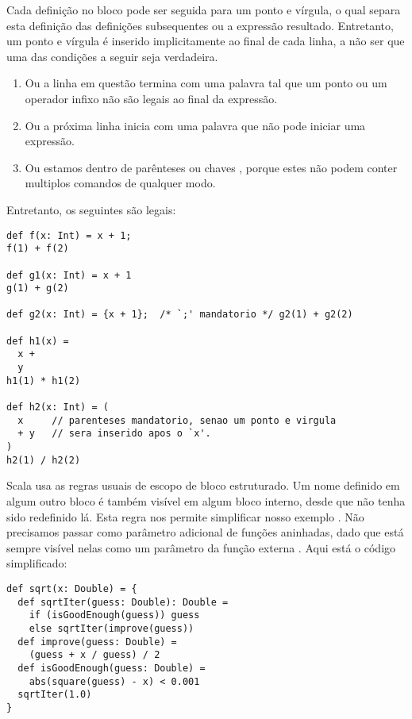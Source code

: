 Cada defini\c{c}\~{a}o no bloco pode ser seguida para um ponto e v\'{i}rgula, o qual 
separa esta defini\c{c}\~{a}o das defini\c{c}\~{o}es subsequentes ou a express\~{a}o  resultado.
Entretanto, um ponto e v\'{i}rgula \'{e} inserido implicitamente ao final de cada linha,
a n\~{a}o ser que uma das condi\c{c}\~{o}es a seguir seja verdadeira.

\begin{enumerate}
\item 
Ou a linha em quest\~{a}o termina com uma palavra tal que um ponto ou um 
operador infixo n\~{a}o s\~{a}o legais ao final da express\~{a}o.
\item 
Ou a pr\'{o}xima linha inicia com uma palavra que n\~{a}o pode iniciar uma express\~{a}o.
\item
Ou estamos dentro de par\^{e}nteses  ou chaves \prog{}, porque 
estes n\~{a}o podem conter multiplos comandos de qualquer modo.
\end{enumerate}

Entretanto, os seguintes s\~{a}o legais:

\begin{lstlisting}
def f(x: Int) = x + 1;
f(1) + f(2)

def g1(x: Int) = x + 1
g(1) + g(2)

def g2(x: Int) = {x + 1};  /* `;' mandatorio */ g2(1) + g2(2)

def h1(x) = 
  x + 
  y
h1(1) * h1(2)

def h2(x: Int) = (
  x     // parenteses mandatorio, senao um ponto e virgula
  + y   // sera inserido apos o `x'.
)
h2(1) / h2(2)
\end{lstlisting}

Scala usa as regras usuais de escopo de bloco estruturado. Um nome definido em
algum outro bloco \'{e} tamb\'{e}m vis\'{i}vel em algum bloco interno, desde que n\~{a}o tenha
sido redefinido l\'{a}. Esta regra nos permite simplificar nosso exemplo .
N\~{a}o precisamos passar  como par\^{a}metro adicional de fun\c{c}\~{o}es aninhadas, dado
que est\'{a} sempre vis\'{i}vel nelas como um par\^{a}metro da fun\c{c}\~{a}o externa .
Aqui est\'{a} o c\'{o}digo simplificado:
   
\begin{lstlisting}
def sqrt(x: Double) = {
  def sqrtIter(guess: Double): Double =
    if (isGoodEnough(guess)) guess
    else sqrtIter(improve(guess))
  def improve(guess: Double) =
    (guess + x / guess) / 2
  def isGoodEnough(guess: Double) =
    abs(square(guess) - x) < 0.001
  sqrtIter(1.0)
}
\end{lstlisting}

